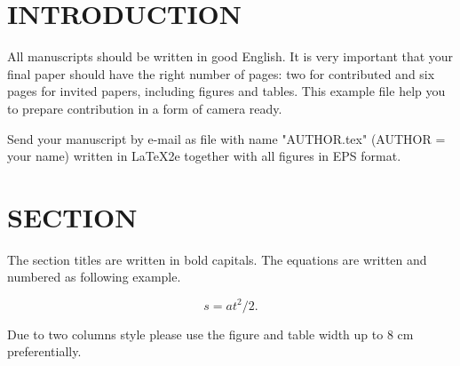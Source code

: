 \documentclass[twoside]{articlek}
\def\be{\begin{equation}}
\def\ee{\end{equation}}
\begin{document}
\sloppy
{}%
\section{INTRODUCTION}

All manuscripts should be written in good English. It is very
important that your final paper should have the right number of
pages: two for contributed and six pages for invited papers,
including figures and
tables. This example file help you to prepare contribution in a
form of camera ready.

Send your manuscript by e-mail as file with name "AUTHOR.tex"
(AUTHOR = your name) written in LaTeX2e together with all figures
in EPS format.

\section{SECTION}

The section titles are written in bold capitals. The equations are
written and numbered as following example.

\be
s = at^2/2.
\ee

Due to two columns style please use the figure and table width up
to 8 cm preferentially.
\end{document}
